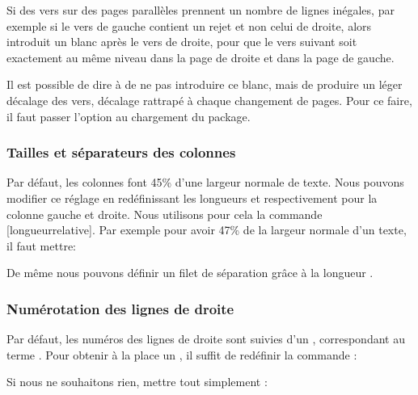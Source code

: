 Si des vers sur des pages parallèles prennent un nombre de lignes inégales, par exemple si le vers de gauche contient un rejet et non  celui de droite, alors  introduit un blanc après le vers de droite, pour que le vers suivant soit exactement au même niveau dans la page de droite et dans la page de gauche.

Il est possible de dire à  de ne pas introduire ce blanc, mais de produire un léger décalage des vers, décalage rattrapé à chaque changement de pages. Pour ce faire, il faut passer l'option  au chargement du package.

\begin{latexcode}
\usepackage[shiftedverses]{eledpar}
\end{latexcode}
 
 \subsubsection{Tailles et séparateurs des colonnes}

Par défaut, les colonnes font 45\% d'une largeur normale de texte. Nous pouvons modifier ce réglage en redéfinissant les longueurs  et  respectivement pour la colonne gauche et droite. Nous utilisons pour cela la commande [longueurrelative]. Par exemple pour avoir 47\% de la largeur normale d'un texte, il faut mettre:

\begin{latexcode}
\setlength{\Lcolwidth}{0.47\textwidth}
\setlength{\Rcolwidth}{0.47\textwidth}
\end{latexcode}

De même nous pouvons définir un filet de séparation grâce à la longueur .

\begin{latexcode}
\setlength{columnrulewidth}{0.4pt}
\end{latexcode}


\subsubsection{Numérotation des lignes de droite}

Par défaut, les numéros des lignes de droite sont suivies d'un , correspondant au terme . Pour obtenir à la place un , il suffit de redéfinir la commande  :

\begin{latexcode}
\renewcommand{\Rlineflag}{D}
\end{latexcode}

Si nous ne souhaitons  rien, mettre tout simplement :


\begin{latexcode}
\renewcommand{\Rlineflag}{}
\end{latexcode}




